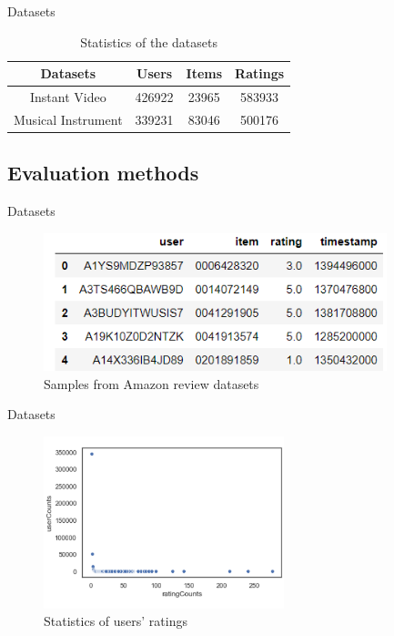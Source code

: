 \documentclass{beamer}
\begin{document}
\begin{frame}{Datasets}

\begin{table}[]
    \centering
    \begin{tabular}{cccc}
    \toprule  
    Datasets & Users & Items & Ratings\\
    \midrule  
    Instant Video & 426922 & 23965 & 583933  \\
    Musical Instrument & 339231 & 83046 & 500176  \\
    \bottomrule
    \end{tabular}
    \caption{Statistics of the datasets}
\end{table}

\subsection{Evaluation methods}
    
    
\end{frame}










\begin{frame}{Datasets}


\begin{figure}
\includegraphics[height=4cm]{figure1.png}
\caption{Samples from Amazon review datasets}
\end{figure}


\end{frame}










\begin{frame}{Datasets}


\begin{figure}
\includegraphics[height=5cm]{figure2.png}
\caption{Statistics of users' ratings}
\end{figure}


\end{frame}
\end{document}
